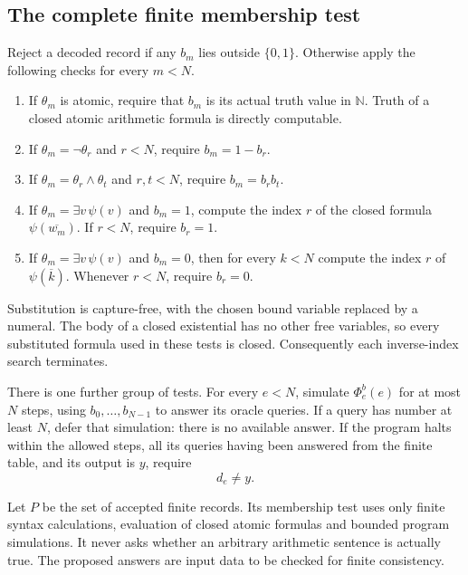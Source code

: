 \documentclass[11pt]{article}
\theoremstyle{definition}
\newcommand{\N}{\mathbb N}
\newcommand{\num}[1]{\overline{#1}}
\begin{document}
\subsection{The complete finite membership test}\label{subsec:membership}

Reject a decoded record if any $b_m$ lies outside $\{0,1\}$. Otherwise apply
the following checks for every $m<N$.

\begin{enumerate}
\item If $\theta_m$ is atomic, require that $b_m$ is its actual truth value
in $\N$. Truth of a closed atomic arithmetic formula is directly computable.
\item If $\theta_m=\neg\theta_r$ and $r<N$, require $b_m=1-b_r$.
\item If $\theta_m=\theta_r\wedge\theta_t$ and $r,t<N$, require
$b_m=b_rb_t$.
\item If $\theta_m=\exists v\,\psi(v)$ and $b_m=1$, compute the index $r$
of the closed formula $\psi(\num{w_m})$. If $r<N$, require $b_r=1$.
\item If $\theta_m=\exists v\,\psi(v)$ and $b_m=0$, then for every $k<N$
compute the index $r$ of $\psi(\num k)$. Whenever $r<N$, require $b_r=0$.
\end{enumerate}

Substitution is capture-free, with the chosen bound variable replaced by a
numeral. The body of a closed existential has no other free variables, so
every substituted formula used in these tests is closed. Consequently each
inverse-index search terminates.

There is one further group of tests. For every $e<N$, simulate
$\Phi_e^b(e)$ for at most $N$ steps, using $b_0,\ldots,b_{N-1}$ to answer
its oracle queries. If a query has number at least $N$, defer that simulation:
there is no available answer. If the program halts within the allowed steps,
all its queries having been answered from the finite table, and its output
is $y$, require
\begin{equation}\label{eq:finite-diagonal}
 d_e\ne y.
\end{equation}

Let $P$ be the set of accepted finite records. Its membership test uses only
finite syntax calculations, evaluation of closed atomic formulas and bounded
program simulations. It never asks whether an arbitrary arithmetic sentence
is actually true. The proposed answers are input data to be checked for
finite consistency.
\end{document}
